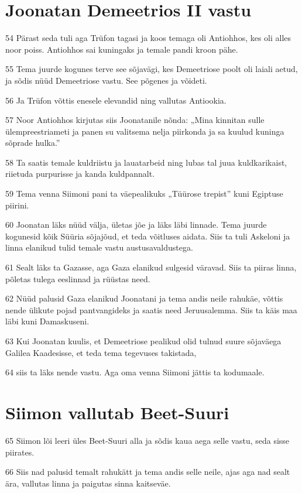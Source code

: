 \section*{Joonatan Demeetrios II vastu}

\par 54 Pärast seda tuli aga Trüfon tagasi ja koos temaga oli Antiohhos, kes oli alles noor poiss. Antiohhos sai kuningaks ja temale pandi kroon pähe.
\par 55 Tema juurde kogunes terve see sõjavägi, kes Demeetriose poolt oli laiali aetud, ja sõdis nüüd Demeetriose vastu. See põgenes ja võideti.
\par 56 Ja Trüfon võttis enesele elevandid ning vallutas Antiookia.
\par 57 Noor Antiohhos kirjutas siis Joonatanile nõnda: „Mina kinnitan sulle ülempreestriameti ja panen su valitsema nelja piirkonda ja sa kuulud kuninga sõprade hulka.”
\par 58 Ta saatis temale kuldriistu ja lauatarbeid ning lubas tal juua kuldkarikaist, riietuda purpurisse ja kanda kuldpannalt.
\par 59 Tema venna Siimoni pani ta väepealikuks „Tüürose trepist” kuni Egiptuse piirini.
\par 60 Joonatan läks nüüd välja, ületas jõe ja läks läbi linnade. Tema juurde kogunesid kõik Süüria sõjajõud, et teda võitluses aidata. Siis ta tuli Askeloni ja linna elanikud tulid temale vastu austusavaldustega.
\par 61 Sealt läks ta Gazasse, aga Gaza elanikud sulgesid väravad. Siis ta piiras linna, põletas tulega eeslinnad ja rüüstas need.
\par 62 Nüüd palusid Gaza elanikud Joonatani ja tema andis neile rahukäe, võttis nende ülikute pojad pantvangideks ja saatis need Jeruusalemma. Siis ta käis maa läbi kuni Damaskuseni.
\par 63 Kui Joonatan kuulis, et Demeetriose pealikud olid tulnud suure sõjaväega Galilea Kaadesisse, et teda tema tegevuses takistada,
\par 64 siis ta läks nende vastu. Aga oma venna Siimoni jättis ta kodumaale. 

\section*{Siimon vallutab Beet-Suuri}

\par 65 Siimon lõi leeri üles Beet-Suuri alla ja sõdis kaua aega selle vastu, seda sisse piirates.
\par 66 Siis nad palusid temalt rahukätt ja tema andis selle neile, ajas aga nad sealt ära, vallutas linna ja paigutas sinna kaitseväe. 

